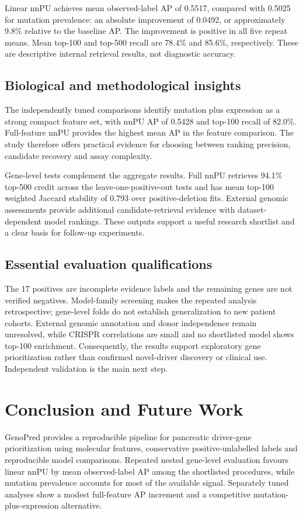 \documentclass[12pt,a4paper,oneside]{report}
\begin{document}
Linear nnPU achieves mean observed-label AP of 0.5517, compared with 0.5025 for mutation prevalence: an absolute improvement of 0.0492, or approximately 9.8\% relative to the baseline AP. The improvement is positive in all five repeat means. Mean top-100 and top-500 recall are 78.4\% and 85.6\%, respectively. These are descriptive internal retrieval results, not diagnostic accuracy.

\section{Biological and methodological insights}
The independently tuned comparisons identify mutation plus expression as a strong compact feature set, with nnPU AP of 0.5428 and top-100 recall of 82.0\%. Full-feature nnPU provides the highest mean AP in the feature comparison. The study therefore offers practical evidence for choosing between ranking precision, candidate recovery and assay complexity.

Gene-level tests complement the aggregate results. Full nnPU retrieves 94.1\% top-500 credit across the leave-one-positive-out tests and has mean top-100 weighted Jaccard stability of 0.793 over positive-deletion fits. External genomic assessments provide additional candidate-retrieval evidence with dataset-dependent model rankings. These outputs support a useful research shortlist and a clear basis for follow-up experiments.

\section{Essential evaluation qualifications}
The 17 positives are incomplete evidence labels and the remaining genes are not verified negatives. Model-family screening makes the repeated analysis retrospective; gene-level folds do not establish generalization to new patient cohorts. External genomic annotation and donor independence remain unresolved, while CRISPR correlations are small and no shortlisted model shows top-100 enrichment. Consequently, the results support exploratory gene prioritization rather than confirmed novel-driver discovery or clinical use. Independent validation is the main next step.

\chapter{Conclusion and Future Work}
GenoPred provides a reproducible pipeline for pancreatic driver-gene prioritization using molecular features, conservative positive-unlabelled labels and reproducible model comparisons. Repeated nested gene-level evaluation favours linear nnPU by mean observed-label AP among the shortlisted procedures, while mutation prevalence accounts for most of the available signal. Separately tuned analyses show a modest full-feature AP increment and a competitive mutation-plus-expression alternative.
\end{document}

